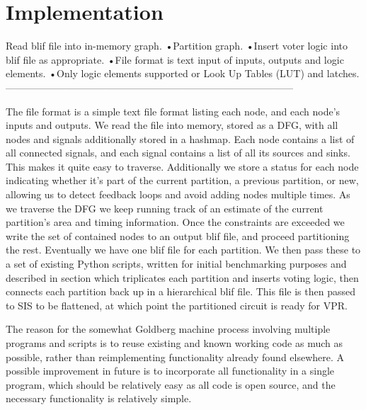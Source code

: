 \documentclass[12pt,draft,a4paper,oneside]{memoir} %
\begin{document}
\section{Implementation}
Read blif file into in-memory graph.
•Partition graph.
•Insert voter logic into blif file as appropriate.
•File format is text input of inputs, outputs and logic elements.
•Only logic elements supported or Look Up Tables (LUT) and latches.
---------------------------------------------------------------------------------------

The file format is a simple text file format listing each node, and each node's inputs and outputs. We read the file into memory, stored as a \ac{DFG}, with all nodes and signals additionally stored in a hashmap. Each node contains a list of all connected signals, and each signal contains a list of all its sources and sinks. This makes it quite easy to traverse. Additionally we store a status for each node indicating whether it's part of the current partition, a previous partition, or new, allowing us to detect feedback loops and avoid adding nodes multiple times.
As we traverse the \ac{DFG} we keep running track of an estimate of the current partition's area and timing information. Once the constraints are exceeded we write the set of contained nodes to an output blif file, and proceed partitioning the rest. Eventually we have one blif file for each partition. We then pass these to a set of existing Python scripts, written for initial benchmarking purposes and described in section  which triplicates each partition and inserts voting logic, then connects each partition back up in a hierarchical blif file. This file is then passed to \ac{SIS}  to be flattened, at which point the partitioned circuit is ready for \ac{VPR}.

The reason for the somewhat Goldberg machine process involving multiple programs and scripts is to reuse existing and known working code as much as possible, rather than reimplementing functionality already found elsewhere. A possible improvement in future is to incorporate all functionality in a single program, which should be relatively easy as all code is open source, and the necessary functionality is relatively simple.
\end{document}
